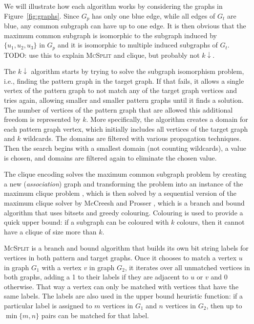 \documentclass{l4proj}
\theoremstyle{definition}
\theoremstyle{remark}
\begin{document}
We will illustrate how each algorithm works by considering the graphs in
Figure~\ref{fig:graphs}. Since $G_p$ has only one blue edge, while all edges of
$G_t$ are blue, any common subgraph can have up to one edge. It is then obvious
that the maximum common subgraph is isomorphic to the subgraph induced by $\{
u_1, u_2, u_3 \}$ in $G_p$ and it is isomorphic to multiple induced subgraphs of
$G_t$. TODO: use this to explain \textsc{McSplit} and clique, but probably not
$k{\downarrow}$.

The $k{\downarrow}$ algorithm \cite{DBLP:conf/aaai/HoffmannMR17} starts by
trying to solve the subgraph isomorphism problem, i.e., finding the pattern
graph in the target graph. If that fails, it allows a single vertex of the
pattern graph to not match any of the target graph vertices and tries again,
allowing smaller and smaller pattern graphs until it finds a solution. The
number of vertices of the pattern graph that are allowed this additional freedom
is represented by $k$. More specifically, the algorithm creates a domain for
each pattern graph vertex, which initially includes all vertices of the target
graph and $k$ wildcards. The domains are filtered with various propagation
techniques. Then the search begins with a smallest domain (not counting
wildcards), a value is chosen, and domains are filtered again to eliminate the
chosen value.

The clique encoding \cite{DBLP:conf/cp/McCreeshNPS16} solves the
maximum common subgraph problem by creating a new (\emph{association}) graph and
transforming the problem into an instance of the maximum clique problem
\cite{Levi1973}, which is then solved by a sequential version of the maximum
clique solver by McCreesh and Prosser \cite{DBLP:journals/topc/McCreeshP15},
which is a branch and bound algorithm that uses bitsets and greedy colouring.
Colouring is used to provide a quick upper bound: if a subgraph can be coloured
with $k$ colours, then it cannot have a clique of size more than $k$.

\textsc{McSplit} \cite{DBLP:conf/ijcai/McCreeshPT17} is a branch and bound
algorithm that builds its own bit string labels for vertices in both pattern and
target graphs. Once it chooses to match a vertex $u$ in graph $G_1$ with a
vertex $v$ in graph $G_2$, it iterates over all unmatched vertices in both
graphs, adding a 1 to their labels if they are adjacent to $u$ or $v$ and 0
otherwise. That way a vertex can only be matched with vertices that have the
same labels. The labels are also used in the upper bound heuristic function:
if a particular label is assigned to $m$ vertices in $G_1$ and $n$ vertices in
$G_2$, then up to $\min \{ m, n \}$ pairs can be matched for that label.
\end{document}
